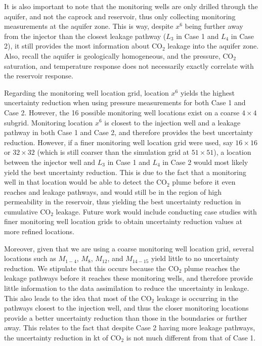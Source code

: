 \documentclass[a4paper,fleqn]{cas-sc}
\begin{document}
It is also important to note that the monitoring wells are only drilled through the aquifer, and not the caprock and reservoir, thus only collecting monitoring measurements at the aquifer zone. This is way, despite $x^6$ being further away from the injector than the closest leakage pathway ($L_3$ in Case 1 and $L_4$ in Case 2), it still provides the most information about CO$_2$ leakage into the aquifer zone. Also, recall the aquifer is geologically homogeneous, and the pressure, CO$_2$ saturation, and temperature response does not necessarily exactly correlate with the reservoir response.

Regarding the monitoring well location grid, location $x^6$ yields the highest uncertainty reduction when using pressure measurements for both Case 1 and Case 2. However, the 16 possible monitoring well locations exist on a coarse $4\times 4$ subgrid. Monitoring location $x^6$ is closest to the injection well and a leakage pathway in both Case 1 and Case 2, and therefore provides the best uncertainty reduction. However, if a finer monitoring well location grid were used, say $16 \times 16$ or $32 \times 32$ (which is still coarser than the simulation grid at $51 \times 51$), a location between the injector well and $L_3$ in Case 1 and $L_4$ in Case 2 would most likely yield the best uncertainty reduction. This is due to the fact that a monitoring well in that location would be able to detect the CO$_2$ plume before it even reaches and leakage pathways, and would still be in the region of high permeability in the reservoir, thus yielding the best uncertainty reduction in cumulative CO$_2$ leakage. Future work would include conducting case studies with finer monitoring well location grids to obtain uncertainty reduction values at more refined locations.

Moreover, given that we are using a coarse monitoring well location grid, several locations such as $M_{1-4}$, $M_8$, $M_{12}$, and $M_{14-15}$ yield little to no uncertainty reduction. We stipulate that this occurs because the CO$_2$ plume reaches the leakage pathways before it reaches these monitoring wells, and therefore provide little information to the data assimilation to reduce the uncertainty in leakage. This also leads to the idea that most of the CO$_2$ leakage is occurring in the pathways closest to the injection well, and thus the closer monitoring locations provide a better uncertainty reduction than those in the boundaries or further away. This relates to the fact that despite Case 2 having more leakage pathways, the uncertainty reduction in kt of CO$_2$ is not much different from that of Case 1.
\end{document}
